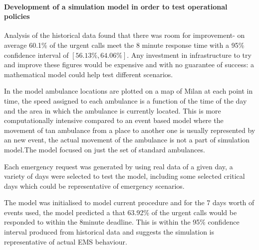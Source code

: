 \documentclass[11pt]{article} %
\begin{document}
\paragraph{Development of a simulation model in order to test operational policies }
Analysis of the historical data found that there was room for improvement- on average 60.1\% of the urgent calls meet the 8 minute response time with a 95\% confidence interval of $ [56.13\%, 64.06\%] $. Any investment in infrastructure to try and improve these figures would be expensive and with no guarantee of success: a mathematical model could help test different scenarios. 

In the model ambulance locations are plotted on a map of Milan at each point in time, the speed assigned to each ambulance is a function of the time of the day and the area in which the ambulance is currently located. This is more  computationally intensive compared to an event based model where the movement of tan ambulance from a place to another one is usually represented by an new event, the actual movement of the ambulance is not a part of simulation model.The model focused on just the set of standard ambulances.

Each emergency request was generated by using real data of a given day, a variety of days were selected to test the model, including some selected critical days which could be representative of emergency scenarios. 

The model was initialised to model current procedure and for the 7 days worth of events used, the model predicted a that 63.92\% of the urgent calls would be responded to within the 8minute deadline. This is within the 95\% confidence interval produced from historical data and suggests the simulation is representative of actual EMS behaviour. 
\end{document}
